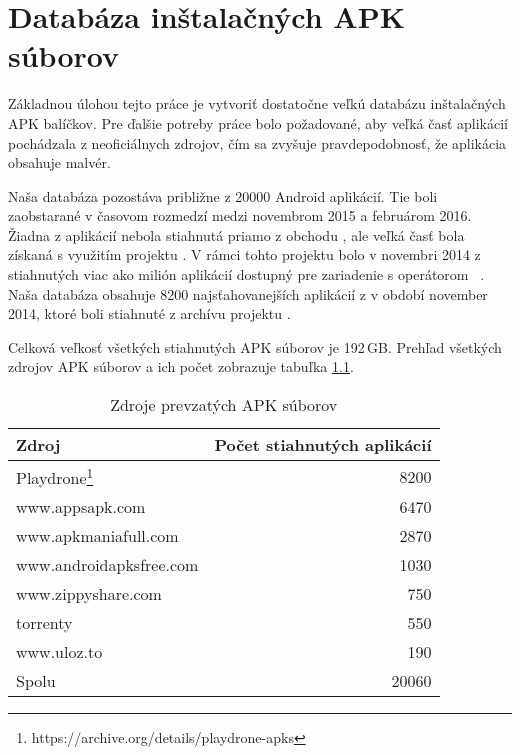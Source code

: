 \chapter{Databáza inštalačných APK súborov}
Základnou úlohou tejto práce je vytvoriť dostatočne veľkú databázu inštalačných APK balíčkov. Pre ďalšie potreby práce bolo požadované, aby veľká časť aplikácií pochádzala z neoficiálnych zdrojov, čím sa zvyšuje pravdepodobnosť, že aplikácia obsahuje malvér.

Naša databáza pozostáva približne z 20000 Android aplikácií. Tie boli zaobstarané v časovom rozmedzí medzi novembrom 2015 a februárom 2016. Žiadna z aplikácií nebola stiahnutá priamo z obchodu , ale veľká časť bola získaná s využitím projektu . V rámci tohto projektu bolo v novembri 2014 z  stiahnutých viac ako milión aplikácií dostupný pre zariadenie  s operátorom ~\cite{Viennot2014}. Naša databáza obsahuje 8200 najsťahovanejších aplikácií z  v období november 2014, ktoré boli stiahnuté z archívu projektu .

Celková veľkosť všetkých stiahnutých APK súborov je 192\,GB. Prehľad všetkých zdrojov APK súborov a ich počet zobrazuje tabuľka \ref{tab:stahovanie}. 

\begin{table}[htb]
\centering
  \begin{tabular}{|l r|}
    \hline
    Zdroj & Počet stiahnutých aplikácií \\\hline\hline
    Playdrone\footnote{https://archive.org/details/playdrone-apks} & 8200 \\
    www.appsapk.com & 6470 \\
    www.apkmaniafull.com & 2870 \\
    www.androidapksfree.com & 1030 \\
    www.zippyshare.com & 750 \\
    torrenty & 550 \\
    www.uloz.to & 190 \\
    \midrule\hline
    Spolu & 20060 \\
    \hline
  \end{tabular}
  \caption{Zdroje prevzatých APK súborov}
  \label{tab:stahovanie}
\end{table}



